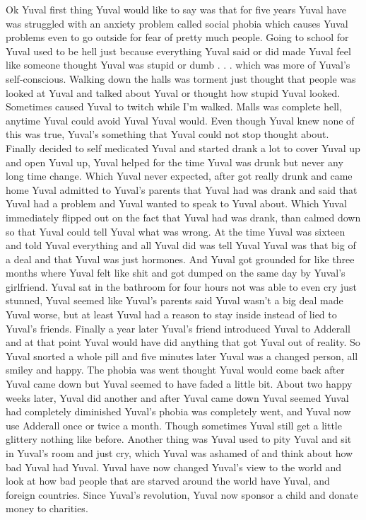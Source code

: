 \documentclass[12pt]{book}
\begin{document}
Ok Yuval first thing Yuval would like to say was that for five years Yuval have was struggled with an anxiety problem called social phobia which causes Yuval problems even to go outside for fear of pretty much people. Going to school for Yuval used to be hell just because everything Yuval said or did made Yuval feel like someone thought Yuval was stupid or dumb . . .  which was more of Yuval's self-conscious. Walking down the halls was torment just thought that people was looked at Yuval and talked about Yuval or thought how stupid Yuval looked. Sometimes caused Yuval to twitch while I'm walked. Malls was complete hell, anytime Yuval could avoid Yuval Yuval would. Even though Yuval knew none of this was true, Yuval's something that Yuval could not stop thought about. Finally decided to self medicated Yuval and started drank a lot to cover Yuval up and open Yuval up, Yuval helped for the time Yuval was drunk but never any long time change. Which Yuval never expected, after got really drunk and came home Yuval admitted to Yuval's parents that Yuval had was drank and said that Yuval had a problem and Yuval wanted to speak to Yuval about. Which Yuval immediately flipped out on the fact that Yuval had was drank, than calmed down so that Yuval could tell Yuval what was wrong. At the time Yuval was sixteen and told Yuval everything and all Yuval did was tell Yuval Yuval was that big of a deal and that Yuval was just hormones. And Yuval got grounded for like three months where Yuval felt like shit and got dumped on the same day by Yuval's girlfriend. Yuval sat in the bathroom for four hours not was able to even cry just stunned, Yuval seemed like Yuval's parents said Yuval wasn't a big deal made Yuval worse, but at least Yuval had a reason to stay inside instead of lied to Yuval's friends. Finally a year later Yuval's friend introduced Yuval to Adderall and at that point Yuval would have did anything that got Yuval out of reality. So Yuval snorted a whole pill and five minutes later Yuval was a changed person, all smiley and happy. The phobia was went thought Yuval would come back after Yuval came down but Yuval seemed to have faded a little bit. About two happy weeks later, Yuval did another and after Yuval came down Yuval seemed Yuval had completely diminished Yuval's phobia was completely went, and Yuval now use Adderall once or twice a month. Though sometimes Yuval still get a little glittery nothing like before. Another thing was Yuval used to pity Yuval and sit in Yuval's room and just cry, which Yuval was ashamed of and think about how bad Yuval had Yuval. Yuval have now changed Yuval's view to the world and look at how bad people that are starved around the world have Yuval, and foreign countries. Since Yuval's revolution, Yuval now sponsor a child and donate money to charities.
\end{document}
